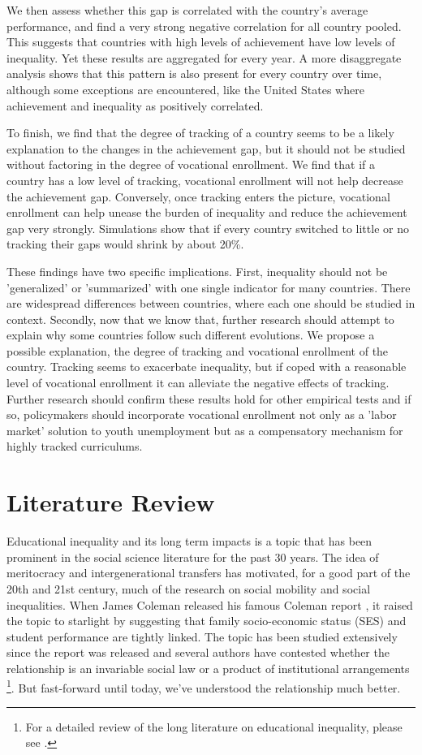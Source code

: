 \documentclass[11pt, a4paper]{article}\usepackage[]{graphicx}\usepackage[]{color}
\begin{document}
We then assess whether this gap is correlated with the country's average performance, and find a very strong negative correlation for all country pooled. This suggests that countries with high levels of achievement have low levels of inequality. Yet these results are aggregated for every year. A more disaggregate analysis shows that this pattern is also present for every country over time, although some exceptions are encountered, like the United States where achievement and inequality as positively correlated.

To finish, we find that the degree of tracking of a country seems to be a likely explanation to the changes in the achievement gap, but it should not be studied without factoring in the degree of vocational enrollment. We find that if a country has a low level of tracking, vocational enrollment will not help decrease the achievement gap. Conversely, once tracking enters the picture, vocational enrollment can help unease the burden of inequality and reduce the achievement gap very strongly. Simulations show that if every country switched to little or no tracking their gaps would shrink by about 20\%.

These findings have two specific implications. First, inequality should not be 'generalized' or 'summarized' with one single indicator for many countries. There are widespread differences between countries, where each one should be studied in context. Secondly, now that we know that, further research should attempt to explain why some countries follow such different evolutions. We propose a possible explanation, the degree of tracking and vocational enrollment of the country. Tracking seems to exacerbate inequality, but if coped with a reasonable level of vocational enrollment it can alleviate the negative effects of tracking. Further research should confirm these results hold for other empirical tests and if so, policymakers should incorporate vocational enrollment not only as a 'labor market' solution to youth unemployment but as a compensatory mechanism for highly tracked curriculums.

\section{Literature Review}
Educational inequality and its long term impacts is a topic that has been prominent in the social science literature for the past 30 years. The idea of meritocracy and intergenerational transfers has motivated, for a good part of the 20th and 21st century, much of the research on social mobility and social inequalities. When James Coleman released his famous Coleman report \citep{coleman1966}, it raised the topic to starlight by suggesting that family socio-economic status (SES) and student performance are tightly linked. The topic has been studied extensively since the report was released and several authors have contested whether the relationship is an invariable social law or a product of institutional arrangements \footnote{For a detailed review of the long literature on educational inequality, please see \citet{gamoran2001}.}. But fast-forward until today, we've understood the relationship much better.
\end{document}
